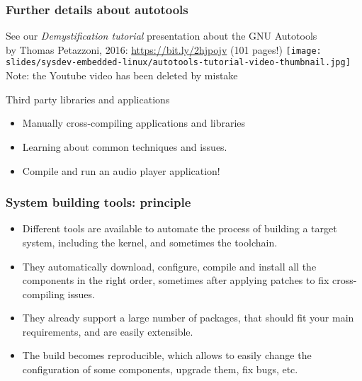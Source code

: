 \begin{frame}
  \frametitle{Further details about autotools}
  See our {\em Demystification tutorial} presentation about the GNU Autotools\\
  by Thomas Petazzoni, 2016: \url{https://bit.ly/2hjpojv} (101 pages!)
  \vfill
  \texttt{[image: slides/sysdev-embedded-linux/autotools-tutorial-video-thumbnail.jpg]}\\
  \tiny Note: the Youtube video has been deleted by mistake
\end{frame}

\setuplabframe
{Third party libraries and applications}
{
  \begin{itemize}
  \item Manually cross-compiling applications and libraries
  \item Learning about common techniques and issues.
  \item Compile and run an audio player application!
  \end{itemize}
}

\begin{frame}
  \frametitle{System building tools: principle}
  \begin{itemize}
  \item Different tools are available to automate the process of
    building a target system, including the kernel, and sometimes the
    toolchain.
  \item They automatically download, configure, compile and install
    all the components in the right order, sometimes after applying
    patches to fix cross-compiling issues.
  \item They already support a large number of packages, that should
    fit your main requirements, and are easily extensible.
  \item The build becomes reproducible, which allows to easily change
    the configuration of some components, upgrade them, fix bugs, etc.
  \end{itemize}
\end{frame}


